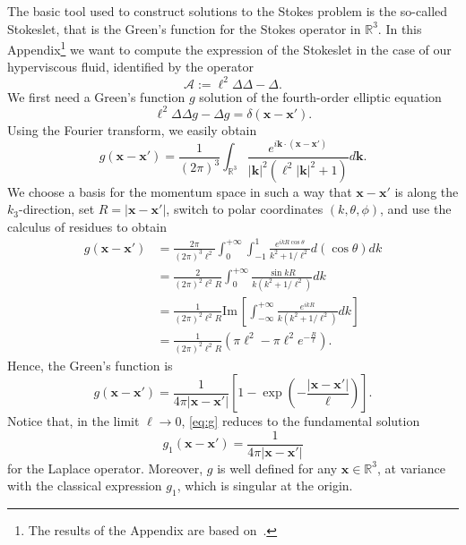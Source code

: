 \documentclass[final]{amsart}
\theoremstyle{definition}
\theoremstyle{definition}
\theoremstyle{remark}
\begin{document}
The basic tool used to construct solutions to the Stokes problem is
the so-called Stokeslet, that is the Green's function for the Stokes
operator in ${\mathbb R}^3$. In this Appendix\footnote{The results of the
  Appendix are based on~\cite{GiuFri12}.}  we want to compute the
expression of the Stokeslet in the case of our hyperviscous fluid,
identified by the operator
\[
\mathcal A:=\ell^2{\Delta}{\Delta} -{\Delta}.
\]
We first need a Green's function $g$ solution of the fourth-order
elliptic equation
\[
\ell^2{\Delta}{\Delta} g - {\Delta} g=\delta({\boldsymbol x}-{\boldsymbol x}').
\]
Using the Fourier transform, we easily obtain
\[
g({\boldsymbol x}-{\boldsymbol x}')=\frac{1}{(2\pi)^3}\int_{{\mathbb R}^3} \frac{e^{i{\boldsymbol k}\cdot({\boldsymbol x}-{\boldsymbol x}')}}{ |{\boldsymbol k}|^2(\ell^2|{\boldsymbol k}|^2+1)}d{\boldsymbol k}.
\]
We choose a basis for the momentum space in such a way that ${\boldsymbol x}-{\boldsymbol x}'$ is along the $k_3$-direction, set $R=|{\boldsymbol x}-{\boldsymbol x}'|$, switch to polar coordinates $(k,\theta,\phi)$, and use the calculus of residues to obtain
\begin{align*}
g({\boldsymbol x}-{\boldsymbol x}')&\mbox{}=\frac{2\pi}{(2\pi)^3\ell^2}\int_0^{+\infty}\int_{-1}^1\frac{e^{ikR\cos\theta}}{k^2+1/\ell^2}d(\cos\theta)dk\\
&\mbox{}=\frac{2}{(2\pi)^2\ell^2 R}\int_0^{+\infty}\frac{\sin{kR}}{k(k^2+1/\ell^2)}dk\\
&\mbox{}=\frac{1}{(2\pi)^2\ell^2
  R}{\mathrm{Im}\,}\left[\int_{-\infty}^{+\infty}\frac{e^{ikR}}{k(k^2+1/\ell^2)}dk\right]\\
&\mbox{}=\frac{1}{(2\pi)^2\ell^2 R}\left(\pi \ell^2-\pi \ell^2e^{-\frac{R}{\ell}}\right).
\end{align*}
Hence, the Green's function is
\begin{equation}\label{eq:g}
g({\boldsymbol x}-{\boldsymbol x}')=\frac{1}{4\pi |{\boldsymbol x}-{\boldsymbol x}'|}\left[1-\exp\left(-\frac{|{\boldsymbol x}-{\boldsymbol x}'|}{\ell}\right)\right].
\end{equation}
Notice that, in the limit $\ell\to 0$, \eqref{eq:g} reduces to the fundamental solution
\begin{equation}\label{eq:g1}
g_1({\boldsymbol x}-{\boldsymbol x}')=\frac{1}{4\pi |{\boldsymbol x}-{\boldsymbol x}'|}
\end{equation}
for the Laplace operator. Moreover, $g$ is well defined for any ${\boldsymbol x}\in{\mathbb R}^3$, at variance with the classical expression $g_1$, which is
singular at the origin.
\end{document}
